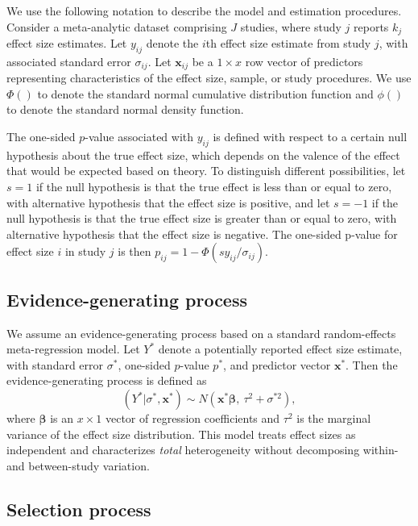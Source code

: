\documentclass[
  american,
  man, donotrepeattitle,floatsintext]{apa7}
\begin{document}
We use the following notation to describe the model and estimation procedures. Consider a meta-analytic dataset comprising \(J\) studies, where study \(j\) reports \(k_j\) effect size estimates. Let \(y_{ij}\) denote the \(i\)th effect size estimate from study \(j\), with associated standard error \(\sigma_{ij}\). Let \(\mathbf{x}_{ij}\) be a \(1 \times x\) row vector of predictors representing characteristics of the effect size, sample, or study procedures. We use \(\Phi()\) to denote the standard normal cumulative distribution function and \(\phi()\) to denote the standard normal density function.

The one-sided \(p\)-value associated with \(y_{ij}\) is defined with respect to a certain null hypothesis about the true effect size, which depends on the valence of the effect that would be expected based on theory.
To distinguish different possibilities,
let \(s = 1\) if the null hypothesis is that the true effect is less than or equal to zero, with alternative hypothesis that the effect size is positive, and let \(s = -1\) if the null hypothesis is that the true effect size is greater than or equal to zero, with alternative hypothesis that the effect size is negative.
The one-sided p-value for effect size \(i\) in study \(j\) is then \(p_{ij} = 1 - \Phi\left(s y_{ij} / \sigma_{ij}\right)\).

\subsection{Evidence-generating process}\label{evidence-generating-process}

We assume an evidence-generating process based on a standard random-effects meta-regression model. Let \(Y^*\) denote a potentially reported effect size estimate, with standard error \(\sigma^*\), one-sided \(p\)-value \(p^*\), and predictor vector \(\mathbf{x}^*\). Then the evidence-generating process is defined as
\begin{equation}
\label{eq:meta-mean-regression}
\left(Y^* | \sigma^*, \mathbf{x}^*\right) \sim N\left(\mathbf{x}^* \boldsymbol\beta, \ \tau^2 + \sigma^{*2}\right),
\end{equation}
where \(\boldsymbol\beta\) is an \(x \times 1\) vector of regression coefficients and \(\tau^2\) is the marginal variance of the effect size distribution. This model treats effect sizes as independent and characterizes \emph{total} heterogeneity without decomposing within- and between-study variation.

\subsection{Selection process}\label{selection-process}
\end{document}
